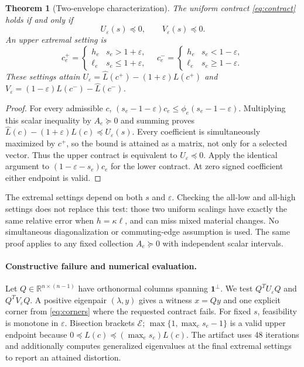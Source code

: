 \documentclass[11pt]{article}
\newtheorem{theorem}{Theorem}
\newcommand{\R}{\mathbb R}
\newcommand{\one}{\mathbf 1}
\newcommand{\eps}{\varepsilon}
\newcommand{\Lo}{\widehat L}
\begin{document}
\begin{theorem}[Two-envelope characterization]\label{thm:two}
The uniform contract \eqref{eq:contract} holds if and only if
\begin{equation}\label{eq:test}
U_\eps(s)\preceq0,\qquad V_\eps(s)\preceq0.
\end{equation}
An upper extremal setting is
\begin{equation}\label{eq:corners}
c_e^+=\begin{cases}h_e&s_e>1+\eps,\\\ell_e&s_e\le1+\eps,\end{cases}
\quad
c_e^-=\begin{cases}h_e&s_e<1-\eps,\\\ell_e&s_e\ge1-\eps.\end{cases}
\end{equation}
These settings attain $U_\eps=\Lo(c^+)-(1+\eps)L(c^+)$ and $V_\eps=(1-\eps)L(c^-)-\Lo(c^-)$.
\end{theorem}
\begin{proof}
For every admissible $c$, $(s_e-1-\eps)c_e\le\phi_e(s_e-1-\eps)$. Multiplying this scalar inequality by $A_e\succeq0$ and summing proves
$\Lo(c)-(1+\eps)L(c)\preceq U_\eps(s)$. Every coefficient is simultaneously maximized by $c^+$, so the bound is attained as a matrix, not only for a selected vector. Thus the upper contract is equivalent to $U_\eps\preceq0$. Apply the identical argument to $(1-\eps-s_e)c_e$ for the lower contract. At zero signed coefficient either endpoint is valid.
\end{proof}

The extremal settings depend on both $s$ and $\eps$. Checking the all-low and all-high settings does not replace this test: those two uniform scalings have exactly the same relative error when $h=\kappa\ell$, and can miss mixed material changes. No simultaneous diagonalization or commuting-edge assumption is used. The same proof applies to any fixed collection $A_e\succeq0$ with independent scalar intervals.

\paragraph{Constructive failure and numerical evaluation.}
Let $Q\in\R^{n\times(n-1)}$ have orthonormal columns spanning $\one^\perp$. We test $Q^TU_\eps Q$ and $Q^TV_\eps Q$. A positive eigenpair $(\lambda,y)$ gives a witness $x=Qy$ and one explicit corner from \eqref{eq:corners} where the requested contract fails. For fixed $s$, feasibility is monotone in $\eps$. Bisection brackets $\mathcal E$; $\max\{1,\max_es_e-1\}$ is a valid upper endpoint because $0\preceq\Lo(c)\preceq(\max_es_e)L(c)$. The artifact uses 48 iterations and additionally computes generalized eigenvalues at the final extremal settings to report an attained distortion.
\end{document}
